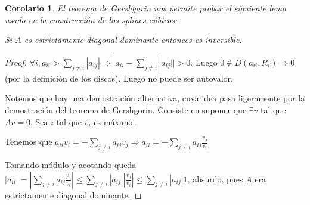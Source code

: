 \documentclass[10pt,a4paper,final]{report}
\newtheorem{corollary}{Corolario}
\begin{document}
\begin{corollary}
	El teorema de Gershgorin nos permite probar el siguiente lema usado en la construcción de los splines cúbicos:
	
	Si $A$ es estrictamente diagonal dominante entonces es inversible.
\end{corollary}

\begin{proof}
	$\forall i, a_{ii} > \displaystyle \sum_{j \neq i} |a_{ij}| \Rightarrow |a_{ii} - \displaystyle \sum_{j \neq i} |a_{ij}| | > 0$. Luego $0 \not\in D(a_{ii},R_i) \Rightarrow 0$ (por la definición de los discos). Luego no puede ser autovalor.
	
	Notemos que hay una demostración alternativa, cuya idea pasa ligeramente por la demostración del teorema de Gershgorin. Consiste en suponer que $\exists v$ tal que $Av = 0$. Sea $i$ tal que $v_i$ es máximo.
	
	Tenemos que $ a_{ii} v_i = - \displaystyle \sum_{j \neq i} a_{ij} v_j \Rightarrow a_{ii} = - \displaystyle \sum_{j \neq i} a_{ij} \frac{v_j}{v_i}$
	
	Tomando módulo y acotando queda $|a_{ii}|  = | \displaystyle \sum_{j \neq i} a_{ij} \frac{v_j}{v_i} | \leq \displaystyle \sum_{j \neq i} |a_{ij}| |\frac{v_j}{v_i}| \leq \displaystyle \sum_{j \neq i} |a_{ij}| 1$, absurdo, pues $A$ era estrictamente diagonal dominante.
\end{proof}
\end{document}
